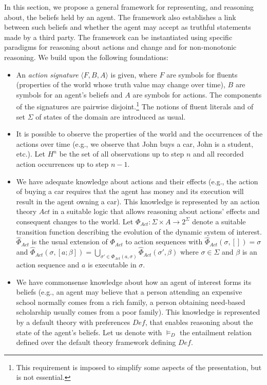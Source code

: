 \documentclass{article}
\begin{document}
In this section, we propose a general framework for representing, and reasoning about, the beliefs held by an agent. The framework also establishes a link between such beliefs and whether the agent may accept as truthful statements made by a third party. The
framework  can be instantiated using specific paradigms for reasoning about actions and change and for non-monotonic reasoning. We build upon the following foundations:
%
 \begin{itemize}
%
\item An \emph{action signature} $\langle F,B,A \rangle$ is given, where $F$ are symbols for fluents (properties of the world whose truth value may change over time),
        $B$ are symbols for an agent's beliefs and $A$ are symbols for actions. The components of the signatures are pairwise disjoint.\footnote{This requirement is imposed to simplify some aspects of the presentation, but is not essential.} The notions of fluent literals and of set $\Sigma$ of states of the domain are introduced as usual.
\item It is possible to  observe the properties of the world and the occurrences of the actions    over time
        (e.g., we observe that John buys a car, John is a student, etc.). 
        Let $H^n$ be the set of all observations up to step $n$ and all recorded action occurrences up to step $n-1$.
 
\item We have adequate knowledge about actions  and their effects (e.g., the action of buying a car requires that the agent has money and its execution will result in the agent owning a car). This knowledge is represented by an action theory $Act$ in a suitable logic that allows reasoning about actions' effects and consequent changes to the world. 
        Let $\Phi_{Act}: \Sigma \times A \rightarrow 2^\Sigma$ denote a suitable transition function describing the evolution of the dynamic system of interest. $\hat\Phi_{Act}$ is the usual extension of $\Phi_{Act}$ to action sequences with $\hat\Phi_{Act}(\sigma, []) = \sigma$ and 
$\hat\Phi_{Act}(\sigma, [a; \beta]) = \bigcup_{\sigma' \in \Phi_{Act}(a, \sigma)} \hat\Phi_{Act}(\sigma', \beta)$ where $\sigma \in \Sigma$ and $\beta$ is an action sequence  and $a$ is executable in $\sigma$.                 

\item We have commonsense knowledge about how an agent of interest forms its beliefs (e.g., an agent may believe that a person attending an expensive school normally comes from a rich family, a person obtaining need-based scholarship  usually comes from a poor family).
This knowledge is represented by a default theory with preferences $\textit{Def}$,  that enables reasoning about the state of the agent's beliefs. Let us denote with $\models_D$ the entailment relation defined over the default theory framework defining $\textit{Def}$.  
 
\end{itemize} 
\end{document}

